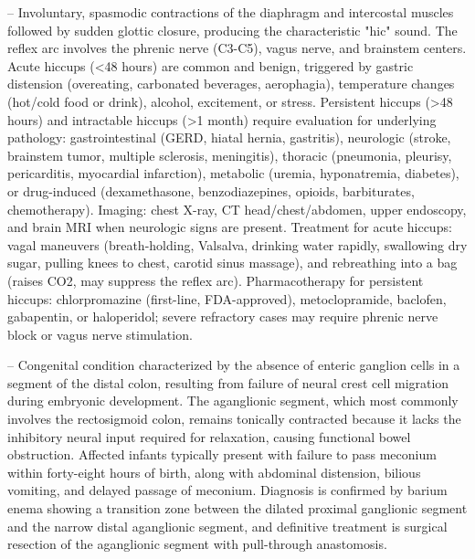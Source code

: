 -- Involuntary, spasmodic contractions of the diaphragm and intercostal muscles followed by sudden glottic closure, producing the characteristic "hic" sound. The reflex arc involves the phrenic nerve (C3-C5), vagus nerve, and brainstem centers. Acute hiccups (<48 hours) are common and benign, triggered by gastric distension (overeating, carbonated beverages, aerophagia), temperature changes (hot/cold food or drink), alcohol, excitement, or stress. Persistent hiccups (>48 hours) and intractable hiccups (>1 month) require evaluation for underlying pathology: gastrointestinal (GERD, hiatal hernia, gastritis), neurologic (stroke, brainstem tumor, multiple sclerosis, meningitis), thoracic (pneumonia, pleurisy, pericarditis, myocardial infarction), metabolic (uremia, hyponatremia, diabetes), or drug-induced (dexamethasone, benzodiazepines, opioids, barbiturates, chemotherapy). Imaging: chest X-ray, CT head/chest/abdomen, upper endoscopy, and brain MRI when neurologic signs are present. Treatment for acute hiccups: vagal maneuvers (breath-holding, Valsalva, drinking water rapidly, swallowing dry sugar, pulling knees to chest, carotid sinus massage), and rebreathing into a bag (raises CO2, may suppress the reflex arc). Pharmacotherapy for persistent hiccups: chlorpromazine (first-line, FDA-approved), metoclopramide, baclofen, gabapentin, or haloperidol; severe refractory cases may require phrenic nerve block or vagus nerve stimulation.

-- Congenital condition characterized by the absence of enteric ganglion cells in a segment of the distal colon, resulting from failure of neural crest cell migration during embryonic development. The aganglionic segment, which most commonly involves the rectosigmoid colon, remains tonically contracted because it lacks the inhibitory neural input required for relaxation, causing functional bowel obstruction. Affected infants typically present with failure to pass meconium within forty-eight hours of birth, along with abdominal distension, bilious vomiting, and delayed passage of meconium. Diagnosis is confirmed by barium enema showing a transition zone between the dilated proximal ganglionic segment and the narrow distal aganglionic segment, and definitive treatment is surgical resection of the aganglionic segment with pull-through anastomosis.

